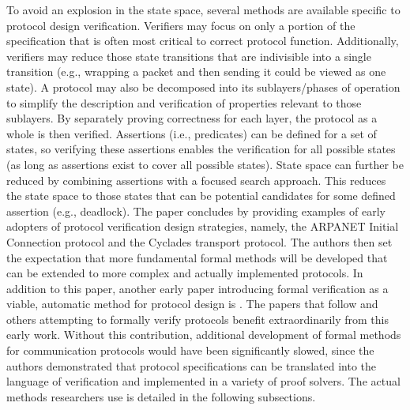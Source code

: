 \documentclass[10pt, journal]{IEEEtran}
\begin{document}
\bigbreak
To avoid an explosion in the state space, several methods are available specific to protocol design verification. Verifiers may focus on only a portion of the specification that is often most critical to correct protocol function. Additionally, verifiers may reduce those state transitions that are indivisible into a single transition (e.g., wrapping a packet and then sending it could be viewed as one state). A protocol may also be decomposed into its sublayers/phases of operation to simplify the description and verification of properties relevant to those sublayers. By separately proving correctness for each layer, the protocol as a whole is then verified. Assertions (i.e., predicates) can be defined for a set of states, so verifying these assertions enables the verification for all possible states (as long as assertions exist to cover all possible states). State space can further be reduced by combining assertions with a focused search approach. This reduces the state space to those states that can be potential candidates for some defined assertion (e.g., deadlock). 
\bigbreak
The paper concludes by providing examples of early adopters of protocol verification design strategies, namely, the ARPANET Initial Connection protocol and the Cyclades transport protocol. The authors then set the expectation that more fundamental formal methods will be developed that can be extended to more complex and actually implemented protocols. In addition to this paper, another early paper introducing formal verification as a viable, automatic method for protocol design is \cite{Holzmann1990}. The papers that follow and others attempting to formally verify protocols benefit extraordinarily from this early work. Without this contribution, additional development of formal methods for communication protocols would have been significantly slowed, since the authors demonstrated that protocol specifications can be translated into the language of verification and implemented in a variety of proof solvers. The actual methods researchers use is detailed in the following subsections.
\bigbreak
\end{document}
